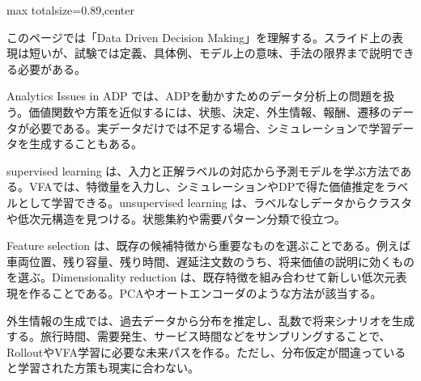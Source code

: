 \begin{minipage}[t]{0.58\textwidth}
\begin{adjustbox}{max totalsize={\textwidth}{0.89\textheight},center}
\begin{minipage}{\textwidth}\scriptsize
{}このページでは「Data Driven Decision Making」を理解する。スライド上の表現は短いが、試験では定義、具体例、モデル上の意味、手法の限界まで説明できる必要がある。\par
Analytics Issues in ADP では、ADPを動かすためのデータ分析上の問題を扱う。価値関数や方策を近似するには、状態、決定、外生情報、報酬、遷移のデータが必要である。実データだけでは不足する場合、シミュレーションで学習データを生成することもある。\par
supervised learning は、入力と正解ラベルの対応から予測モデルを学ぶ方法である。VFAでは、特徴量を入力し、シミュレーションやDPで得た価値推定をラベルとして学習できる。unsupervised learning は、ラベルなしデータからクラスタや低次元構造を見つける。状態集約や需要パターン分類で役立つ。\par
Feature selection は、既存の候補特徴から重要なものを選ぶことである。例えば車両位置、残り容量、残り時間、遅延注文数のうち、将来価値の説明に効くものを選ぶ。Dimensionality reduction は、既存特徴を組み合わせて新しい低次元表現を作ることである。PCAやオートエンコーダのような方法が該当する。\par
外生情報の生成では、過去データから分布を推定し、乱数で将来シナリオを生成する。旅行時間、需要発生、サービス時間などをサンプリングすることで、RolloutやVFA学習に必要な未来パスを作る。ただし、分布仮定が間違っていると学習された方策も現実に合わない。\par

\end{minipage}
\end{adjustbox}
\end{minipage}
